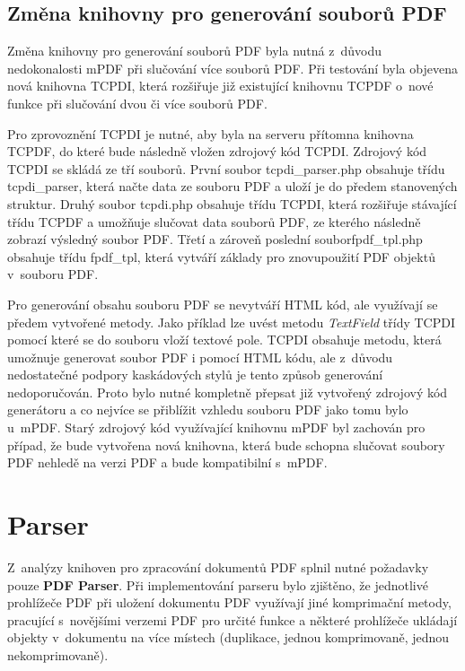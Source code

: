 \subsection{Změna knihovny pro generování souborů PDF}
Změna knihovny pro generování souborů PDF byla nutná z~důvodu nedokonalosti mPDF při slučování více souborů PDF. Při testování byla objevena nová knihovna TCPDI, která rozšiřuje již existující knihovnu TCPDF o~nové funkce při slučování dvou či více souborů PDF. 
\par
Pro zprovoznění TCPDI je nutné, aby byla na serveru přítomna knihovna TCPDF, do které bude následně vložen zdrojový kód TCPDI. Zdrojový kód TCPDI se skládá ze tří souborů. První soubor tcpdi\_parser.php obsahuje třídu tcpdi\_parser, která načte data ze souboru PDF a uloží je do předem stanovených struktur. Druhý soubor tcpdi.php obsahuje třídu TCPDI, která rozšiřuje stávající třídu TCPDF a umožňuje slučovat data souborů PDF, ze kterého následně zobrazí výsledný soubor PDF. Třetí a zároveň poslední souborfpdf\_tpl.php obsahuje třídu fpdf\_tpl, která vytváří základy pro znovupoužití PDF objektů v~souboru PDF.
\par
Pro generování obsahu souboru PDF se nevytváří HTML kód, ale využívají se předem vytvořené metody. Jako příklad lze uvést metodu \textit{TextField} třídy TCPDI pomocí které se do souboru vloží textové pole. TCPDI obsahuje metodu, která umožnuje generovat soubor PDF i pomocí HTML kódu, ale z~důvodu nedostatečné podpory kaskádových stylů je tento způsob generování nedoporučován. Proto bylo nutné kompletně přepsat již vytvořený zdrojový kód generátoru a co nejvíce se přiblížit vzhledu souboru PDF jako tomu bylo u~mPDF. Starý zdrojový kód využívající knihovnu mPDF byl zachován pro případ, že bude vytvořena nová knihovna, která bude schopna slučovat soubory PDF nehledě na verzi PDF a bude kompatibilní s~mPDF. 

\section{Parser}
Z~analýzy knihoven pro zpracování dokumentů PDF splnil nutné požadavky pouze \textbf{PDF Parser}. Při implementování parseru bylo zjištěno, že jednotlivé prohlížeče PDF při uložení dokumentu PDF využívají jiné komprimační metody, pracující s~novějšími verzemi PDF pro určité funkce a některé prohlížeče ukládají objekty v~dokumentu na více místech (duplikace, jednou komprimovaně, jednou nekomprimovaně).


